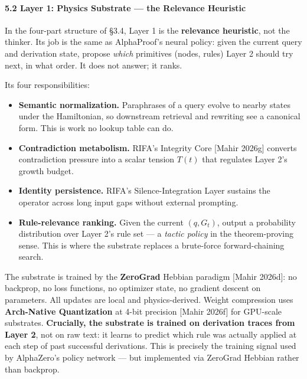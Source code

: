 \documentclass[
  11pt,
  a4paper,
]{article}
\providecommand{\tightlist}{%
  \setlength{\itemsep}{0pt}\setlength{\parskip}{0pt}}
\begin{document}
\paragraph{5.2 Layer 1: Physics Substrate --- the Relevance
Heuristic}\label{layer-1-physics-substrate-the-relevance-heuristic}

In the four-part structure of §3.4, Layer 1 is the \textbf{relevance
heuristic}, not the thinker. Its job is the same as AlphaProof's neural
policy: given the current query and derivation state, propose
\emph{which} primitives (nodes, rules) Layer 2 should try next, in what
order. It does not answer; it ranks.

Its four responsibilities:

\begin{itemize}
\tightlist
\item
  \textbf{Semantic normalization.} Paraphrases of a query evolve to
  nearby states under the Hamiltonian, so downstream retrieval and
  rewriting see a canonical form. This is work no lookup table can do.
\item
  \textbf{Contradiction metabolism.} RIFA's Integrity Core {[}Mahir
  2026g{]} converts contradiction pressure into a scalar tension
  \(T(t)\) that regulates Layer 2's growth budget.
\item
  \textbf{Identity persistence.} RIFA's Silence-Integration Layer
  sustains the operator across long input gaps without external
  prompting.
\item
  \textbf{Rule-relevance ranking.} Given the current \((q, G_t)\),
  output a probability distribution over Layer 2's rule set --- a
  \emph{tactic policy} in the theorem-proving sense. This is where the
  substrate replaces a brute-force forward-chaining search.
\end{itemize}

The substrate is trained by the \textbf{ZeroGrad} Hebbian paradigm
{[}Mahir 2026d{]}: no backprop, no loss functions, no optimizer state,
no gradient descent on parameters. All updates are local and
physics-derived. Weight compression uses \textbf{Arch-Native
Quantization} at 4-bit precision {[}Mahir 2026f{]} for GPU-scale
substrates. \textbf{Crucially, the substrate is trained on derivation
traces from Layer 2}, not on raw text: it learns to predict which rule
was actually applied at each step of past successful derivations. This
is precisely the training signal used by AlphaZero's policy network ---
but implemented via ZeroGrad Hebbian rather than backprop.
\end{document}
